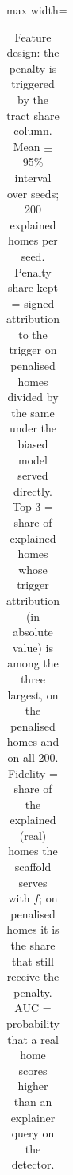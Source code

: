 \begin{table}[t]
\begin{adjustbox}{max width=\linewidth}
\begin{tabular}{llrrrrrrr}
\bottomrule
\end{tabular}
\end{adjustbox}
\caption{Feature design: the penalty is triggered by the tract share column. Mean $\pm$ 95\% interval over seeds; 200 explained homes per seed. Penalty share kept = signed attribution to the trigger on penalised homes divided by the same under the biased model served directly. Top 3 = share of explained homes whose trigger attribution (in absolute value) is among the three largest, on the penalised homes and on all 200. Fidelity = share of the explained (real) homes the scaffold serves with $f$; on penalised homes it is the share that still receive the penalty. AUC = probability that a real home scores higher than an explainer query on the detector.}
\label{tab:main_feature}
\end{table}
